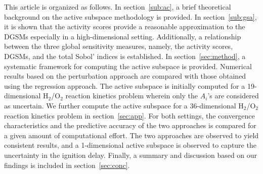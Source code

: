 This article is organized as follows. In section~\ref{sub:ac}, a brief
theoretical background on the active subspace methodology is provided. In
section~\ref{sub:gsa}, it is shown that the activity scores provide a
reasonable approximation to the DGSMs especially in a high-dimensional setting.
Additionally, a relationship between the three global sensitivity measures,
namely, the activity scores, DGSMs, and the total Sobol' indices is
established. In section~\ref{sec:method}, a systematic framework for computing
the active subspace is provided. 
Numerical results based on the perturbation approach are compared with those
obtained using the regression approach.  The active 
subspace is initially computed for a 19-dimensional 
H$_2$/O$_2$ reaction kinetics problem wherein only the $A_i$'s are
considered as uncertain. We further compute the active subspace
for a 36-dimensional H$_2$/O$_2$ reaction kinetics problem in section~\ref{sec:app}.
For both settings, the convergence characteristics and the predictive accuracy
of the two approaches is compared for a given amount of computational effort. The two
approaches are observed to yield consistent results, and a 1-dimensional active subspace
is observed to capture the uncertainty in the ignition delay.
Finally, a summary and discussion based on our findings is included in
section~\ref{sec:conc}.










 





